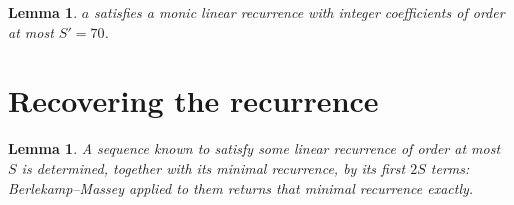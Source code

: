 \documentclass[11pt,a4paper]{article}
\theoremstyle{plain}
\newtheorem{lemma}[theorem]{Lemma}
\theoremstyle{definition}
\begin{document}
\begin{lemma}\label{lem:cf}
$a$ satisfies a monic linear recurrence with integer coefficients of order at most
$S'=70$.
\end{lemma}

\section{Recovering the recurrence}

\begin{lemma}\label{lem:bm}
A sequence known to satisfy some linear recurrence of order at most $S$ is determined, together
with its minimal recurrence, by its first $2S$ terms: Berlekamp--Massey applied to them returns
that minimal recurrence exactly.
\end{lemma}
\end{document}

